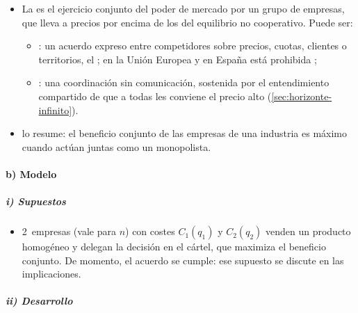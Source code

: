 \documentclass[11pt]{article}
\begin{document}
\begin{itemize}
\item La  es el ejercicio conjunto del poder de mercado por un grupo de empresas, que lleva a precios por encima de los del equilibrio no cooperativo. Puede ser:
  \begin{itemize}
  \item {}: un acuerdo expreso entre competidores sobre precios, cuotas, clientes o territorios, el ; en la Unión Europea y en España está prohibida ;
  \item {}: una coordinación sin comunicación, sostenida por el entendimiento compartido de que a todas les conviene el precio alto (\ref{sec:horizonte-infinito}).
  \end{itemize}
\item \textcite{Stigler1950Monopoly} lo resume: el beneficio conjunto de las empresas de una industria es máximo cuando actúan juntas como un monopolista.
\end{itemize}

\paragraph{b) Modelo}

\subparagraph{i) Supuestos}

\begin{itemize}
\item 2~empresas (vale para $n$) con costes $C_1(q_1)$ y $C_2(q_2)$ venden un producto homogéneo y delegan la decisión en el cártel, que maximiza el beneficio conjunto. De momento, el acuerdo se cumple: ese supuesto se discute en las implicaciones.
\end{itemize}

\subparagraph{ii) Desarrollo}
\end{document}
